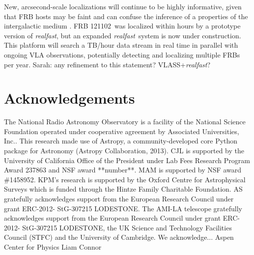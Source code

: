 \documentclass[twocolumn]{aastex61}
\newcommand{\rf}{\emph{realfast}}
\newcommand{\frb}{FRB 121102}
\begin{document}
New, arcsecond-scale localizations will continue to be highly informative, given that FRB hosts may be faint and can confuse the inference of a properties of the intergalactic medium \citep{2014ApJ...783L..35D}. \frb\ was localized within hours by a prototype version of \rf, but an expanded \rf\ system is now under construction. This platform will search a TB/hour data stream in real time in parallel with ongoing VLA observations, potentially detecting and localizing multiple FRBs per year. {\color{red} Sarah: any refinement to this statement?} VLASS+\rf?



\section*{Acknowledgements}
The National Radio Astronomy Observatory is a facility of the National Science Foundation operated under cooperative agreement by Associated Universities, Inc..
This research made use of Astropy, a community-developed core Python package for Astronomy (Astropy Collaboration, 2013).
CJL is supported by the University of California Office of the President under Lab Fees Research Program Award 237863 and NSF award **number**.
MAM is supported by NSF award \#1458952. 
KPM's research is supported by the Oxford Centre for Astrophysical Surveys which is funded through the Hintze Family Charitable Foundation. AS gratefully acknowledges support from the European Research Council under grant ERC-2012- StG-307215 LODESTONE. The AMI-LA telescope gratefully acknowledges support from the European Research Council under grant ERC-2012- StG-307215 LODESTONE, the UK Science and Technology Facilities Council (STFC) and the University of Cambridge.
We acknowledge...
Aspen Center for Physics
Liam Connor





\end{document}
